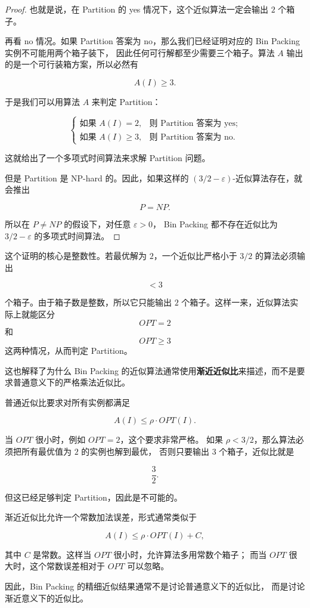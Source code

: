 \documentclass[UTF8,openany,12pt]{ctexbook}
\theoremstyle{remark}
\begin{document}
\begin{proof}
也就是说，在 Partition 的 yes 情况下，这个近似算法一定会输出 $2$ 个箱子。

再看 no 情况。如果 Partition 答案为 no，那么我们已经证明对应的 Bin Packing 实例不可能用两个箱子装下，
因此任何可行解都至少需要三个箱子。算法 $A$ 输出的是一个可行装箱方案，所以必然有

$$
A(I)\ge 3.
$$

于是我们可以用算法 $A$ 来判定 Partition：

$$
\begin{cases}
\text{如果 } A(I)=2, & \text{则 Partition 答案为 yes;}\\
\text{如果 } A(I)\ge 3, & \text{则 Partition 答案为 no.}
\end{cases}
$$

这就给出了一个多项式时间算法来求解 Partition 问题。

但是 Partition 是 NP-hard 的。因此，如果这样的
$(3/2-\varepsilon)$-近似算法存在，就会推出

$$
P=NP.
$$

所以在 $P\ne NP$ 的假设下，对任意 $\varepsilon>0$，
Bin Packing 都不存在近似比为 $3/2-\varepsilon$ 的多项式时间算法。
\end{proof}

这个证明的核心是整数性。若最优解为 $2$，一个近似比严格小于 $3/2$ 的算法必须输出

$$
<3
$$

个箱子。由于箱子数是整数，所以它只能输出 $2$ 个箱子。这样一来，近似算法实际上就能区分
$$
OPT=2
$$
和
$$
OPT\ge 3
$$
这两种情况，从而判定 Partition。

这也解释了为什么 Bin Packing 的近似算法通常使用\textbf{渐近近似比}来描述，而不是要求普通意义下的严格乘法近似比。

普通近似比要求对所有实例都满足

$$
A(I)\le \rho\cdot OPT(I).
$$

当 $OPT$ 很小时，例如 $OPT=2$，这个要求非常严格。
如果 $\rho<3/2$，那么算法必须把所有最优值为 $2$ 的实例也解到最优，
否则只要输出 $3$ 个箱子，近似比就是

$$
\frac{3}{2}.
$$

但这已经足够判定 Partition，因此是不可能的。

渐近近似比允许一个常数加法误差，形式通常类似于

$$
A(I)\le \rho\cdot OPT(I)+C,
$$

其中 $C$ 是常数。这样当 $OPT$ 很小时，允许算法多用常数个箱子；
而当 $OPT$ 很大时，这个常数误差相对于 $OPT$ 可以忽略。

因此，Bin Packing 的精细近似结果通常不是讨论普通意义下的近似比，
而是讨论渐近意义下的近似比。
\end{document}
